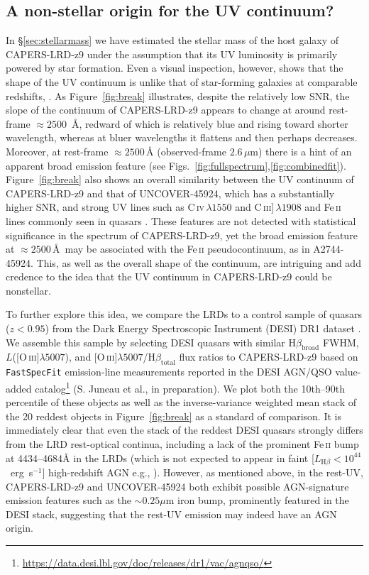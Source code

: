 \documentclass[twocolumn]{aastex7}
\newcommand{\oiii}{[O\,\textsc{iii}]}
\newcommand{\Feii}{Fe\,\textsc{ii}}
\newcommand{\src}{CAPERS-LRD-z9}
\begin{document}
\subsection{A non-stellar origin for the UV continuum?}\label{sec:nonstellar}
In \S\ref{sec:stellarmass} we have estimated the stellar mass of the host galaxy of \src{} under the assumption that its UV luminosity is primarily powered by star formation. Even a visual inspection, however, shows that the shape of the UV continuum is unlike that of star-forming galaxies at comparable redshifts, \citep[e.g.,][]{castellano22,kokorev25}. As Figure~\ref{fig:break} illustrates, despite the relatively low SNR, the slope of the continuum of \src{} appears to change at around rest-frame $\approx 2500$~\AA{}, redward of which is relatively blue and rising toward shorter wavelength, whereas at bluer wavelengths it flattens and then perhaps decreases. 
Moreover, at rest-frame $\approx2500$\,\AA{} (observed-frame $2.6\,\mu$m) there is a hint of an apparent broad emission feature (see Figs.~\ref{fig:fullspectrum},\ref{fig:combinedfit}). 
Figure~\ref{fig:break} also shows an overall similarity between the UV continuum of \src{} and that of UNCOVER-45924, which has a substantially higher SNR, and strong UV lines such as C\,\textsc{iv}\,$\lambda 1550$ and C\,\textsc{iii}]\,$\lambda 1908$ and \Feii{} lines commonly seen in quasars \citep[e.g.][]{vestergaard01}.
These features are not detected with statistical significance in the spectrum of \src{}, yet the broad emission feature at $\approx2500$\,\AA\ may be associated with the \Feii{} pseudocontinuum, as in A2744-45924.
This, as well as the overall shape of the continuum, are intriguing and add credence to the idea that the UV continuum in \src{} could be nonstellar. 

To further explore this idea, we compare the LRDs to a control sample of quasars ($z<0.95$) from the Dark Energy Spectroscopic Instrument (DESI) DR1 dataset \citep{desi_dr1}. We assemble this sample by selecting DESI quasars with similar H$\beta_\textrm{broad}$ FWHM, $L$(\oiii$\lambda5007$), and \oiii$\lambda5007$/H$\beta_\textrm{total}$ flux ratios to \src{} based on \texttt{FastSpecFit} \citep{moustakas2023} emission-line measurements reported in the DESI AGN/QSO value-added catalog\footnote{\url{https://data.desi.lbl.gov/doc/releases/dr1/vac/agnqso/}} (S. Juneau et al., in preparation). We plot both the 10th--90th percentile of these objects as well as the inverse-variance weighted mean stack of the 20 reddest objects in Figure~\ref{fig:break} as a standard of comparison. It is immediately clear that even the stack of the reddest DESI quasars strongly differs from the LRD rest-optical continua, including a lack of the prominent \Feii{} bump at 4434–4684\AA{} in the LRDs (which is not expected to appear in faint [$L_{\textrm{H}\beta}<10^{44}$~erg~s$^{-1}$] high-redshift AGN e.g., \citealt{Trefoloni2024}). 
However, as mentioned above, in the rest-UV, \src{} and UNCOVER-45924 both exhibit possible AGN-signature emission features such as the $\sim0.25\mu$m iron bump, prominently featured in the DESI stack, suggesting that the rest-UV emission may indeed have an AGN origin.
\end{document}
